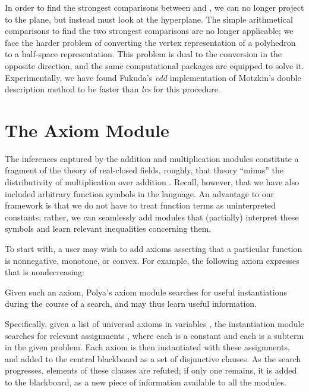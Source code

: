 \documentclass[runningheds]{llncs}
\begin{document}
In order to find the strongest comparisons between  and , we can no longer project to the  plane, but instead must look at the  hyperplane. The simple arithmetical comparisons to find the two strongest comparisons are no longer applicable; we face the harder problem of converting the vertex representation of a polyhedron to a half-space representation. This problem is dual to the conversion in the opposite direction, and the same computational packages are equipped to solve it. Experimentally, we have found Fukuda's \emph{cdd} implementation of Motzkin's double description method \cite{fukuda:prodon:96} to be faster than \emph{lrs} for this procedure.







\section{The Axiom Module}
\label{section:functions}

The inferences captured by the addition and multiplication modules constitute a fragment of the theory of real-closed fields, roughly, that theory ``minus'' the distributivity of multiplication over addition \cite{avigad:friedman:06}. Recall, however, that we have also included arbitrary function symbols in the language.
An advantage to our framework is that we do not have to treat function
terms as uninterpreted constants; rather, we can seamlessly add
modules that (partially) interpret these symbols and learn relevant inequalities
concerning them.

To start with, a user may wish to add axioms asserting that a particular function  is nonnegative, monotone, or convex. For example, the following axiom expresses that  is nondecreasing:

Given such an axiom, Polya's axiom module searches for useful
instantiations during the course of a search, and may thus learn useful information.

Specifically, given a list of universal axioms in variables , the instantiation module searches for relevant assignments , where each  is a constant and each  is a subterm in the given problem. Each axiom is then instantiated with these assignments, and added to the central blackboard as a set of disjunctive clauses. As the search progresses, elements of these clauses are refuted; if only one remains, it is added to the blackboard, as a new piece of information available to all the modules.
\end{document}
